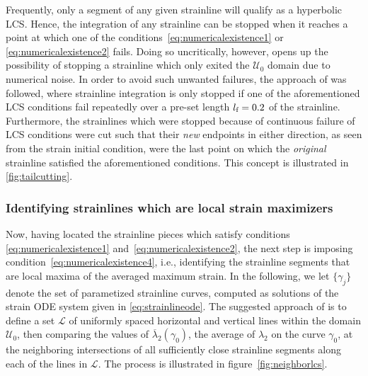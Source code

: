 Frequently, only a segment of any given strainline will qualify as a hyperbolic
LCS\@. Hence, the integration of any strainline can be stopped when it reaches
a point at which one of the conditions~\eqref{eq:numericalexistence1} or
\eqref{eq:numericalexistence2} fails. Doing so uncritically, however, opens up
the possibility of stopping a strainline which only exited the $\mathcal{U}_{0}$
domain due to numerical noise. In order to avoid such unwanted failures,
the approach of \textcite{farazmand2012computing} was followed, where
strainline integration is only stopped if one of the aforementioned LCS
conditions fail repeatedly over a pre-set length $l_{\textnormal{f}}=0.2$ of
the strainline. Furthermore, the strainlines which were stopped because
of continuous failure of LCS conditions were cut such that their \emph{new}
endpoints in either direction, as seen from the strain initial condition, were
the last point on which the \emph{original} strainline satisfied the
aforementioned conditions. This concept is illustrated in
\cref{fig:tailcutting}.



\clearpage
\subsubsection{Identifying strainlines which are local strain maximizers}
\label{ssub:identifying_strainlines_which_are_local_strain_maximizers}

Now, having located the strainline pieces which satisfy conditions
\eqref{eq:numericalexistence1} and~\eqref{eq:numericalexistence2}, the next
step is imposing condition~\eqref{eq:numericalexistence4}, i.e., identifying the
strainline segments that are local maxima of the averaged maximum strain. In
the following, we let $\{\gamma_{j}\}$ denote the set of parametized strainline
curves, computed as solutions of the strain ODE system given in
\cref{eq:strainlineode}. The suggested approach of
\textcite{farazmand2012computing} is to define a set $\mathcal{L}$ of uniformly
spaced horizontal and vertical lines within the domain $\mathcal{U}_{0}$, then
comparing the values of $\overline{\lambda}_{2}(\gamma_{0})$, the average of
$\lambda_{2}$ on the curve $\gamma_{0}$, at the neighboring intersections of all
sufficiently close strainline segments along each of the lines in
$\mathcal{L}$. The process is illustrated in figure~\ref{fig:neighborlcs}.



